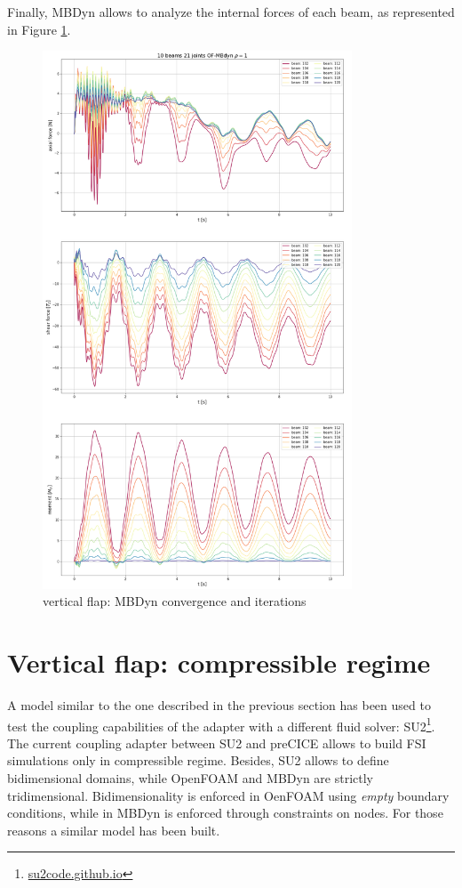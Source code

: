 Finally, MBDyn allows to analyze the internal forces of each beam, as represented in Figure \ref{fig:vf_mbd_internal}.

\begin{figure}[htbp!]
	\centering
	\includegraphics[width=0.82\textwidth]{images/vert_flap/OF-MBDyn_rho1_act.png}
	\caption{vertical flap: MBDyn convergence and iterations}
	\label{fig:vf_mbd_internal}
\end{figure}


\newpage

\section{Vertical flap: compressible regime}
\label{sec:su2-mbd}

A model similar to the one described in the previous section has been used to test the coupling capabilities of the adapter with a different fluid solver: SU2\footnote{\href{https://su2code.github.io/}{su2code.github.io}}. The current coupling adapter between SU2 and preCICE allows to build FSI simulations only in compressible regime. Besides, SU2 allows to define bidimensional domains, while OpenFOAM and MBDyn are strictly tridimensional. Bidimensionality is enforced in OenFOAM using \textit{empty} boundary conditions, while in MBDyn is enforced through constraints on nodes.
For those reasons a similar model has been built. 


